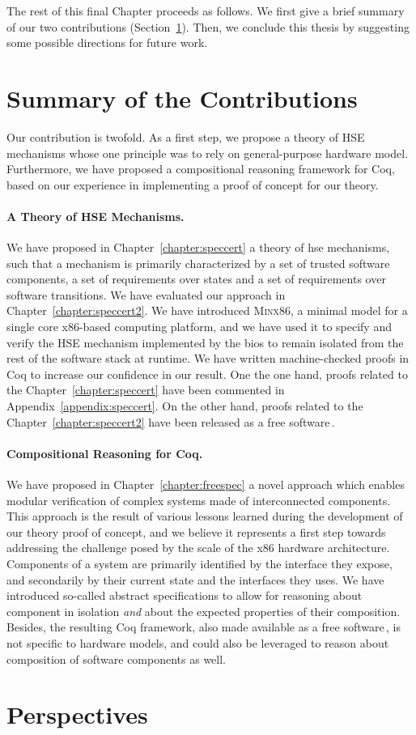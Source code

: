 The rest of this final Chapter proceeds as follows.
%
We first give a brief summary of our two contributions
(Section~\ref{sec:conclusion:summary}).
%
Then, we conclude this thesis by suggesting some possible directions for future
work.

\section{Summary of the Contributions}
\label{sec:conclusion:summary}

Our contribution is twofold.
%
As a first step, we propose a theory of HSE mechanisms whose one principle was
to rely on general-purpose hardware model.
%
Furthermore, we have proposed a compositional reasoning framework for Coq, based
on our experience in implementing a proof of concept for our theory.

\paragraph{A Theory of HSE Mechanisms.}
%
We have proposed in Chapter~\ref{chapter:speccert} a theory of \ac{hse}
mechanisms, such that a mechanism is primarily characterized by a set of trusted
software components, a set of requirements over states and a set of requirements
over software transitions.
%
We have evaluated our approach in Chapter~\ref{chapter:speccert2}.
%
We have introduced {\scshape Minx86}, a minimal model for a single core
x86-based computing platform, and we have used it to specify and verify the HSE
mechanism implemented by the \ac{bios} to remain isolated from the rest of the
software stack at runtime.
%
We have written machine-checked proofs in Coq to increase our confidence in our
result.
%
One the one hand, proofs related to the Chapter~\ref{chapter:speccert} have been
commented in Appendix~\ref{appendix:speccert}.
%
On the other hand, proofs related to the Chapter~\ref{chapter:speccert2} have
been released as a free software\,\cite{letan2016speccertcode}.

\paragraph{Compositional Reasoning for Coq.}
%
We have proposed in Chapter~\ref{chapter:freespec} a novel approach which
enables modular verification of complex systems made of interconnected
components.
%
This approach is the result of various lessons learned during the development of
our theory proof of concept, and we believe it represents a first step towards
addressing the challenge posed by the scale of the x86 hardware architecture.
%
Components of a system are primarily identified by the interface they expose,
and secondarily by their current state and the interfaces they uses.
%
We have introduced so-called abstract specifications to allow for reasoning
about component in isolation \emph{and} about the expected properties of their
composition.
%
Besides, the resulting Coq framework, also made available as a free
software\,\cite{letan2018freespeccode}, is not specific to hardware models, and
could also be leveraged to reason about composition of software components as
well.

\section{Perspectives}
\label{sec:conclusion:perspectives}
